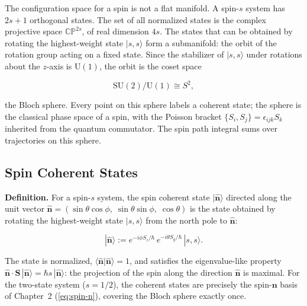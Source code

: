 The configuration space for a spin is not a flat manifold. A spin-$s$ system has $2s+1$ orthogonal states. The set of all normalized states is the complex projective space $\mathbb{CP}^{2s}$, of real dimension $4s$. The states that can be obtained by rotating the highest-weight state $|s,s\rangle$ form a submanifold: the orbit of the rotation group acting on a fixed state. Since the stabilizer of $|s,s\rangle$ under rotations about the $z$-axis is $\mathrm{U}(1)$, the orbit is the coset space
\begin{linenomath}
\begin{equation}
\mathrm{SU}(2)/\mathrm{U}(1) \cong S^{2},
\end{equation}
\end{linenomath}
the Bloch sphere. Every point on this sphere labels a coherent state; the sphere is the classical phase space of a spin, with the Poisson bracket $\{S_i, S_j\} = \epsilon_{ijk}S_k$ inherited from the quantum commutator. The spin path integral sums over trajectories on this sphere.

\subsection{Spin Coherent States}

\medskip\noindent\textbf{Definition.} For a spin-$s$ system, the spin coherent state $|\hat{\bm n}\rangle$ directed along the unit vector $\hat{\bm n} = (\sin\theta\cos\phi,\;\sin\theta\sin\phi,\;\cos\theta)$ is the state obtained by rotating the highest-weight state $|s,s\rangle$ from the north pole to $\hat{\bm n}$:
\begin{linenomath}
\begin{equation}
|\hat{\bm n}\rangle := e^{-i\phi S_{z}/\hbar}\,e^{-i\theta S_{y}/\hbar}\,|s,s\rangle .
\label{eq:spin-coherent-state-def}
\end{equation}
\end{linenomath}
The state is normalized, $\langle\hat{\bm n}|\hat{\bm n}\rangle = 1$, and satisfies the eigenvalue-like property $\hat{\bm n}\!\cdot\!\bm S\,|\hat{\bm n}\rangle = \hbar s\,|\hat{\bm n}\rangle$: the projection of the spin along the direction $\hat{\bm n}$ is maximal. For the two-state system ($s = 1/2$), the coherent states are precisely the spin-$\bm n$ basis of Chapter~2 (\eqref{eq:spin-n}), covering the Bloch sphere exactly once.

